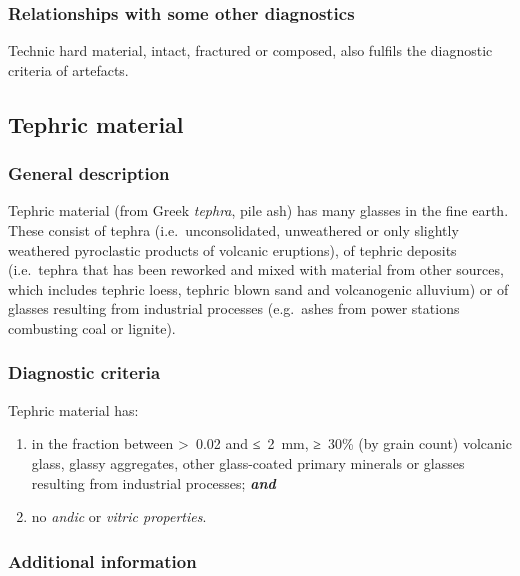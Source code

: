 \documentclass[
  letterpaper,
  DIV=11,
  numbers=noendperiod]{scrreprt}
\begin{document}
\hypertarget{relationships-with-some-other-diagnostics-64}{%
\subsubsection{Relationships with some other
diagnostics}\label{relationships-with-some-other-diagnostics-64}}

Technic hard material, intact, fractured or composed, also fulfils the
diagnostic criteria of artefacts.

\hypertarget{tephric-material}{%
\subsection{Tephric material}\label{tephric-material}}

\hypertarget{general-description-69}{%
\subsubsection{General description}\label{general-description-69}}

Tephric material (from Greek \emph{tephra}, pile ash) has many glasses
in the fine earth. These consist of tephra (i.e.~unconsolidated,
unweathered or only slightly weathered pyroclastic products of volcanic
eruptions), of tephric deposits (i.e.~tephra that has been reworked and
mixed with material from other sources, which includes tephric loess,
tephric blown sand and volcanogenic alluvium) or of glasses resulting
from industrial processes (e.g.~ashes from power stations combusting
coal or lignite).

\hypertarget{diagnostic-criteria-75}{%
\subsubsection{Diagnostic criteria}\label{diagnostic-criteria-75}}

Tephric material has:

\begin{enumerate}
\def\labelenumi{\arabic{enumi}.}
\item
  in the fraction between \textgreater~0.02 and ≤~2~mm, ≥~30\% (by grain
  count) volcanic glass, glassy aggregates, other glass-coated primary
  minerals or glasses resulting from industrial processes;
  \textbf{\emph{and}}
\item
  no \emph{andic} or \emph{vitric properties}.
\end{enumerate}

\hypertarget{additional-information-36}{%
\subsubsection{Additional information}\label{additional-information-36}}
\end{document}
